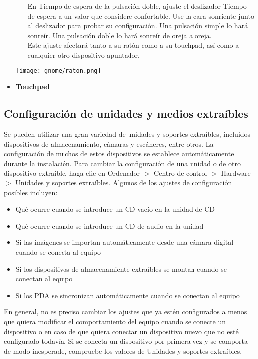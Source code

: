 \documentclass[12pt,letterpaper]{book}
\begin{document}
\begin{itemize}
\begin{itemize}
En Tiempo de espera de la pulsación doble, ajuste el deslizador Tiempo de espera a un valor que considere confortable. Use la cara sonriente junto al deslizador para probar su configuración. Una pulsación simple lo hará sonreír. Una pulsación doble lo hará sonreír de oreja a oreja.\\

Este ajuste afectará tanto a su ratón como a su touchpad, así como a cualquier otro dispositivo apuntador.
\end{itemize}
\begin{center}
\texttt{[image: gnome/raton.png]} 
\end{center}
\item{\large \bf Touchpad}\\

\end{itemize}


\subsection{Configuración de unidades y medios extraíbles}
Se pueden utilizar una gran variedad de unidades y soportes extraíbles, incluidos dispositivos de almacenamiento, cámaras y escáneres, entre otros. La configuración de muchos de estos dispositivos se establece automáticamente durante la instalación. Para cambiar la configuración de una unidad o de otro dispositivo extraíble, haga clic en Ordenador $>$ Centro de control $>$ Hardware $>$ Unidades y soportes extraíbles.
Algunos de los ajustes de configuración posibles incluyen:
\begin{itemize}
\item Qué ocurre cuando se introduce un CD vacío en la unidad de CD
\item Qué ocurre cuando se introduce un CD de audio en la unidad
\item Si las imágenes se importan automáticamente desde una cámara digital cuando se conecta al equipo
\item Si los dispositivos de almacenamiento extraíbles se montan cuando se conectan al equipo
\item Si los PDA se sincronizan automáticamente cuando se conectan al equipo
\end{itemize}
En general, no es preciso cambiar los ajustes que ya estén configurados a menos que quiera modificar el comportamiento del equipo cuando se conecte un dispositivo o en caso de que quiera conectar un dispositivo nuevo que no esté configurado todavía. Si se conecta un dispositivo por primera vez y se comporta de modo inesperado, compruebe los valores de Unidades y soportes extraíbles.
\end{document}
